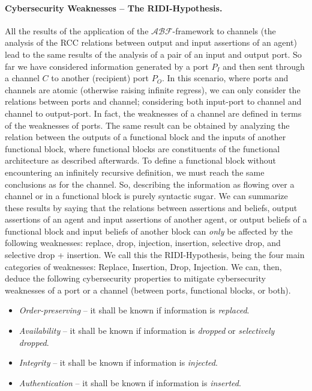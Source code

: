 \documentclass[runningheads]{llncs}
\newcommand{\assertionRegion}{\mathcal{A}}
\newcommand{\beliefRegion}{\mathcal{B}}
\newcommand{\factRegion}{\mathcal{F}}
\newcommand{\abftheory}{\assertionRegion\beliefRegion\factRegion}
\begin{document}
\paragraph{Cybersecurity Weaknesses -- The RIDI-Hypothesis.} 
All the results of the application of the
$\abftheory$-framework to channels (the analysis of the RCC relations
between output and input assertions of an agent)
lead to the same results of the
analysis of a pair of an input and output port.
So far we have
considered information generated by a port $P_I$ and then sent through a
channel $C$ to another (recipient) port $P_O$. In this scenario, where ports and
channels are atomic (otherwise raising infinite regress), we can only
consider the relations between ports and channel; considering both input-port
to channel and channel to output-port.  In fact, the weaknesses of a channel
are defined in terms of the weaknesses of ports.  
The same result can be obtained by analyzing the relation between the outputs
of a functional block and the inputs of another functional block, where
functional blocks are constituents of the functional architecture as described
afterwards.  To define a functional block without encountering an
infinitely recursive definition, we must reach the same conclusions as for the
channel. So, describing the information as flowing over a channel or in
a functional block is purely syntactic sugar.
We can summarize these results by saying that the relations between assertions
and beliefs, output assertions of an agent and input assertions of another
agent, or output beliefs of a functional block and input beliefs of another
block can \emph{only} be affected by the following weaknesses: replace, drop,
injection, insertion, selective drop, and selective drop + insertion. 
We call this the RIDI-Hypothesis, being the
four main categories of weaknesses: Replace, Insertion, Drop, Injection. We can,
then, deduce the following cybersecurity properties to mitigate cybersecurity weaknesses
of a port or a channel (between ports, functional blocks, or both).
\begin{itemize}
	\item \emph{Order-preserving} -- it shall be known if information is \emph{replaced}.
	\item \emph{Availability} -- it shall be known if information is \emph{dropped} or \emph{selectively dropped}.
	\item \emph{Integrity} -- it shall be known if information is \emph{injected}.
	\item \emph{Authentication} -- it shall be known if information is \emph{inserted}.
\end{itemize}
\end{document}
